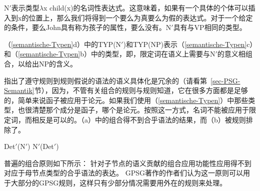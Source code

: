 N$'$表示类型$\lambda$x child(x)的名词性表达式。这意味着，如果有一个具体的个体可以插入到x的位置上，那么我们将得到一个要么为真要么为假的表达式。对于一个给定的条件，要么John具有称为孩子的属性，要么没有。N$'$具有与VP相同的类型。

（\ref{semantische-Typen}d）中的TYP(N$'$)和TYP(NP)表示（\ref{semantische-Typen}c）和（\ref{semantische-Typen}b）中的类型，即，限定词在语义上需要与N$'$的意义相组合，以给出NP的含义。

\citet*[]{GKPS85a}指出了遵守规则到规则假说的语法的语义具体化是冗余的（请看第~\ref{sec-PSG-Semantik}节），因为，不管有关组合的规则与规则知道，它在很多方面都是足够的，简单来说函子被应用于论元。如果我们使用（\ref{semantische-Typen}）中那些类型，也很清楚那个成分是函子，哪个是论元。按照这一方式，名词不能被应用于限定词，而相反是可以的。（a）中的组合得不到合乎语法的结果，而（b）被规则排除了。

\begin{samepage}
\eal
\ex Det$'$(N$'$)
\ex N$'$(Det$'$)
\zl
\end{samepage}

\noindent
普遍的组合原则如下所示：
\eanoraggedright
针对子节点的语义贡献的组合应用功能性应用得不到对应于母节点类型的合乎语法的表达。
\z
GPSG著作的作者们认为这一原则可以用于大部分的GPSG规则，这样只有少部分情况需要用外在的规则来处理。

